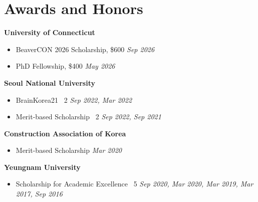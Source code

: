 \section{Awards and Honors}
\noindent\textbf{University of Connecticut}
\begin{itemize}
    \item[]BeaverCON 2026 Scholarship, \$600 \hfill \textit{Sep 2026}
    \item[]PhD Fellowship, \$400 \hfill \textit{May 2026}
\end{itemize}
\noindent\textbf{Seoul National University}
\begin{itemize}
    \item[]BrainKorea21 \texttimes\ 2 \hfill \textit{Sep 2022, Mar 2022}
    \item[]Merit-based Scholarship \texttimes\ 2 \hfill \textit{Sep 2022, Sep 2021}
\end{itemize}
\noindent\textbf{Construction Association of Korea}
\begin{itemize}
    \item[]Merit-based Scholarship \hfill \textit{Mar 2020}
\end{itemize}
\noindent\textbf{Yeungnam University}
\begin{itemize}
    \item[]Scholarship for Academic Excellence \texttimes\ 5 \hfill \textit{Sep 2020, Mar 2020, Mar 2019, Mar 2017, Sep 2016}
\end{itemize}